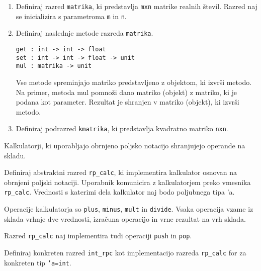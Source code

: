 \begin{ex}
\begin{enumerate}[label=(\Alph*)]
\item Definiraj razred \lstinline{matrika}, ki predstavlja \texttt{mxn} matrike realnih \v stevil. Razred naj se inicializira s parametroma \texttt{m} in \texttt{n}.

\item Definiraj naslednje metode razreda \lstinline{matrika}.
\begin{lstlisting}
get : int -> int -> float
set : int -> int -> float -> unit
mul : matrika -> unit
\end{lstlisting}

Vse metode spreminjajo matriko predstavljeno z objektom, ki izvr\v si metodo.  Na primer, metoda mul pomno\v zi dano matriko (objekt) z matriko, ki je podana kot parameter. Rezultat je shranjen v matriko (objekt), ki izvr\v si metodo.

\item Definiraj podrazred \lstinline{kmatrika}, ki predstavlja kvadratno matriko \texttt{nxn}.
\end{enumerate}
\end{ex} 



\begin{ex}
Kalkulatorji, ki uporabljajo obrnjeno poljsko notacijo shranjujejo operande na skladu.

Definiraj abstraktni razred \lstinline{rp_calc}, ki implementira kalkulator osnovan na obrnjeni poljski notaciji. Uporabnik komunicira z kalkulatorjem preko vmesnika \lstinline{rp_calc}. Vrednosti s katerimi dela kalkulator naj bodo poljubnega tipa 'a. 

Operacije kalkulatorja so \texttt{plus}, \texttt{minus}, \texttt{mult} in \texttt{divide}. Vsaka operacija vzame iz sklada vrhnje dve vrednosti, izra\v cuna operacijo in vrne rezultat na vrh sklada.

Razred \lstinline{rp_calc} naj implementira tudi operaciji \texttt{push} in \texttt{pop}. 

Definiraj konkreten razred \lstinline{int_rpc} kot implementacijo razreda \lstinline{rp_calc} for za konkreten tip \texttt{'a=int}.
\end{ex} 





%
%
%       
%






